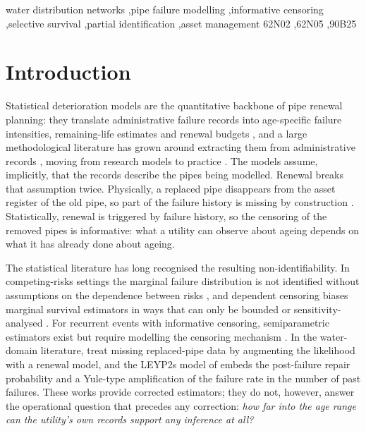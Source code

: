 \documentclass[review,12pt,authoryear]{elsarticle}
\begin{document}
\begin{frontmatter}
\begin{keyword}
water distribution networks \sep pipe failure modelling \sep informative
censoring \sep selective survival \sep partial identification \sep asset
management
\MSC[2010] 62N02 \sep 62N05 \sep 90B25
\end{keyword}

\end{frontmatter}

\linenumbers

\section{Introduction}
\label{sec:intro}

Statistical deterioration models are the quantitative backbone of pipe
renewal planning: they translate administrative failure records into
age-specific failure intensities, remaining-life estimates and renewal
budgets \citep{Kleiner2001,Kleiner2002,Scheidegger2015}, and a large methodological literature has grown around extracting them from administrative records \citep{LeGat2000,Alvisi2010,Winkler2018,Rajani2012}, moving from research models to practice \citep{Renaud2012}. The models assume,
implicitly, that the records describe the pipes being modelled. Renewal
breaks that assumption twice. Physically, a replaced pipe disappears from
the asset register of the old pipe, so part of the failure history is
missing by construction \citep{Scheidegger2013,Ouellet2018}. Statistically,
renewal is triggered by failure history, so the censoring of the removed
pipes is informative: what a utility can observe about ageing depends on
what it has already done about ageing.

The statistical literature has long recognised the resulting
non-identifiability. In competing-risks settings the marginal failure
distribution is not identified without assumptions on the dependence between
risks \citep{Tsiatis1975,Crowder1994}, and dependent censoring biases
marginal survival estimators in ways that can only be bounded or
sensitivity-analysed \citep{Slud1983,Zheng1995,Scharfstein1999}. For
recurrent events with informative censoring, semiparametric estimators exist
but require modelling the censoring mechanism \citep{Wang2001,Prentice1981,
Aalen1978,Andersen1993,Cox1972,Lin1995}. In the water-domain literature,
\citet{Scheidegger2013} treat missing replaced-pipe data by augmenting the
likelihood with a renewal model, and the LEYP2s model of \citet{LeGat2013}
embeds the post-failure repair probability and a Yule-type amplification of
the failure rate in the number of past failures. These works provide
corrected estimators; they do not, however, answer the operational question
that precedes any correction: \emph{how far into the age range can the
utility's own records support any inference at all?}
\end{document}
